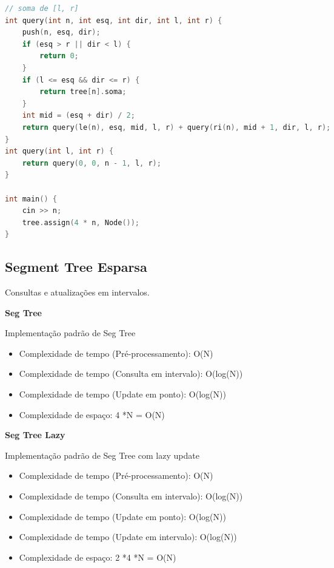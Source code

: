 \documentclass[11pt, a4paper, oneside]{book}
\begin{document}
\begin{multicols}{2}
\begin{lstlisting}[language=C++]
// soma de [l, r]
int query(int n, int esq, int dir, int l, int r) {
    push(n, esq, dir);
    if (esq > r || dir < l) {
        return 0;
    }
    if (l <= esq && dir <= r) {
        return tree[n].soma;
    }
    int mid = (esq + dir) / 2;
    return query(le(n), esq, mid, l, r) + query(ri(n), mid + 1, dir, l, r);
}
int query(int l, int r) {
    return query(0, 0, n - 1, l, r);
}

int main() {
    cin >> n;
    tree.assign(4 * n, Node());
}
\end{lstlisting}
\end{multicols}

\hfill

\subsection{Segment Tree Esparsa}


Consultas e atualizações em intervalos.



\textbf{Seg Tree} 

Implementação padrão de Seg Tree



\begin{itemize}
\item Complexidade de tempo (Pré-processamento): O(N)
\item Complexidade de tempo (Consulta em intervalo): O(log(N))
\item Complexidade de tempo (Update em ponto): O(log(N))
\item Complexidade de espaço: 4 *N = O(N)
\end{itemize}



\textbf{Seg Tree Lazy} 

Implementação padrão de Seg Tree com lazy update



\begin{itemize}
\item Complexidade de tempo (Pré-processamento): O(N)
\item Complexidade de tempo (Consulta em intervalo): O(log(N))
\item Complexidade de tempo (Update em ponto): O(log(N))
\item Complexidade de tempo (Update em intervalo): O(log(N))
\item Complexidade de espaço: 2 *4 *N = O(N)
\end{itemize}
\end{document}
